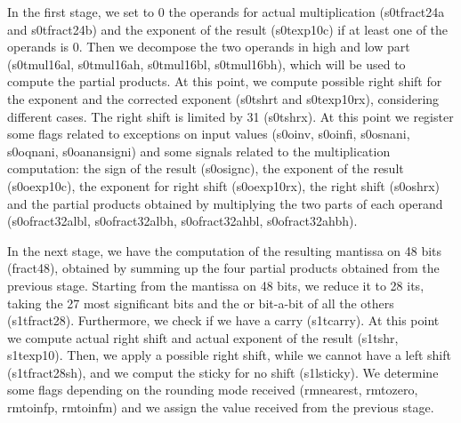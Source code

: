 In the first stage, we set to 0 the operands for actual multiplication (s0t\textunderscore fract24a and s0t\textunderscore fract24b) and the exponent of the result (s0t\textunderscore exp10c) if at least one of the operands is 0. Then we decompose the two operands in high and low part (s0t\textunderscore mul16\textunderscore al, s0t\textunderscore mul16\textunderscore ah, s0t\textunderscore mul16\textunderscore bl, s0t\textunderscore mul16\textunderscore bh), which will be used to compute the partial products. At this point, we compute possible right shift for the exponent and the corrected exponent (s0t\textunderscore shr\textunderscore t and s0t\textunderscore exp10rx), considering different cases. The right shift is limited by 31 (s0t\textunderscore shrx). 
At this point we register some flags related to exceptions on input values (s0o\textunderscore inv, s0o\textunderscore inf\textunderscore i, s0o\textunderscore snan\textunderscore i, s0o\textunderscore qnan\textunderscore i, s0o\textunderscore anan\textunderscore sign\textunderscore i) and some signals related to the multiplication computation: the sign of the result (s0o\textunderscore signc), the exponent of the result (s0o\textunderscore exp10c), the exponent for right shift (s0o\textunderscore exp10rx), the right shift (s0o\textunderscore shrx) and the partial products obtained by multiplying the two parts of each operand (s0o\textunderscore fract32\textunderscore albl, s0o\textunderscore fract32\textunderscore albh, s0o\textunderscore fract32\textunderscore ahbl, s0o\textunderscore fract32\textunderscore ahbh).

In the next stage, we have the computation of the resulting mantissa on 48 bits (fract48), obtained by summing up the four partial products obtained from the previous stage. Starting from the mantissa on 48 bits, we reduce it to 28 its, taking the 27 most significant bits and the or bit-a-bit of all the others (s1t\textunderscore fract28). Furthermore, we check if we have a carry (s1t\textunderscore carry). At this point we compute actual right shift and actual exponent of the result (s1t\textunderscore shr, s1t\textunderscore exp10).
Then, we apply a possible right shift, while we cannot have a left shift (s1t\textunderscore fract28sh), and we comput the sticky for no shift (s1l\textunderscore sticky). We determine some flags depending on the rounding mode received (rm\textunderscore nearest, rm\textunderscore to\textunderscore zero, rm\textunderscore to\textunderscore infp, rm\textunderscore to\textunderscore infm) and we assign the value received from the previous stage.

